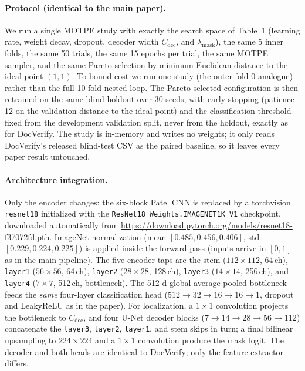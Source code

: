 \documentclass[11pt]{article}
\begin{document}
\paragraph{Protocol (identical to the main paper).} We run a single MOTPE study
with exactly the search space of Table~1 (learning rate, weight decay, dropout,
decoder width $C_{\text{dec}}$, and $\lambda_{\text{mask}}$), the same 5 inner
folds, the same 50 trials, the same 15 epochs per trial, the same MOTPE sampler,
and the same Pareto selection by minimum Euclidean distance to the ideal point
$(1,1)$. To bound cost we run one study (the outer-fold-0 analogue) rather than
the full 10-fold nested loop. The Pareto-selected configuration is then
retrained on the same blind holdout over 30 seeds, with early stopping
(patience 12 on the validation distance to the ideal point) and the
classification threshold fixed from the development validation split, never from
the holdout, exactly as for DocVerify. The study is in-memory and writes no
weights; it only reads DocVerify's released blind-test CSV as the paired
baseline, so it leaves every paper result untouched.

\paragraph{Architecture integration.} Only the encoder changes: the six-block
Patel CNN is replaced by a torchvision \texttt{resnet18} initialized with the
\texttt{ResNet18\_Weights.IMAGENET1K\_V1} checkpoint, downloaded automatically
from \url{https://download.pytorch.org/models/resnet18-f37072fd.pth}. ImageNet
normalization (mean $[0.485,0.456,0.406]$, std $[0.229,0.224,0.225]$) is applied
inside the forward pass (inputs arrive in $[0,1]$ as in the main pipeline). The
five encoder taps are the
stem ($112\times112$, 64\,ch), \texttt{layer1} ($56\times56$, 64\,ch),
\texttt{layer2} ($28\times28$, 128\,ch), \texttt{layer3} ($14\times14$,
256\,ch), and \texttt{layer4} ($7\times7$, 512\,ch, bottleneck). The 512-d
global-average-pooled bottleneck feeds the \emph{same} four-layer
classification head ($512\!\to\!32\!\to\!16\!\to\!16\!\to\!1$, dropout and
LeakyReLU as in the paper). For localization, a $1\times1$ convolution projects
the bottleneck to $C_{\text{dec}}$, and four U-Net decoder blocks
($7\!\to\!14\!\to\!28\!\to\!56\!\to\!112$) concatenate the \texttt{layer3},
\texttt{layer2}, \texttt{layer1}, and stem skips in turn; a final bilinear
upsampling to $224\times224$ and a $1\times1$ convolution produce the mask logit.
The decoder and both heads are identical to DocVerify; only the feature
extractor differs.
\end{document}
